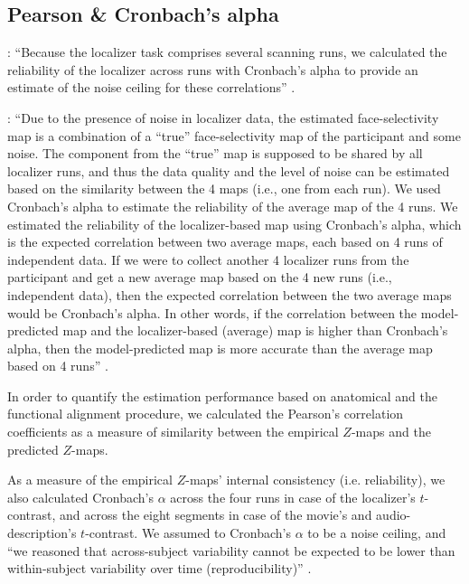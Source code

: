 \subsection{Pearson \& Cronbach's alpha}




\citet{jiahui2022cross}: ``Because the localizer task comprises several scanning
runs, we calculated the reliability of the localizer across runs with Cronbach's
alpha to provide an estimate of the noise ceiling for these correlations''
\citep{jiahui2022cross}.

%
\citep{feilong2022individualized}: ``Due to the presence of noise in localizer
data, the estimated face-selectivity map is a combination of a “true”
face-selectivity map of the participant and some noise.
%
The component from the “true” map is supposed to be shared by all localizer
runs, and thus the data quality and the level of noise can be estimated based on
the similarity between the 4 maps (i.e., one from each run).
%
We used Cronbach's alpha to estimate the reliability  of the average map of the
4 runs.
%
We estimated the reliability of the localizer-based map using Cronbach's alpha,
which is the expected correlation between two average maps, each based on 4 runs
of independent data.
%
If we were to collect another 4 localizer runs from the participant and get a
new average map based on the 4 new runs (i.e., independent data), then the
expected correlation between the two average maps would be Cronbach's alpha.
%
In other words, if the correlation between the model-predicted map and the
localizer-based (average) map is higher than Cronbach's alpha, then the
model-predicted map is more accurate than the average map based on 4 runs''
\citep{feilong2022individualized}.

In order to quantify the estimation performance based on anatomical and the
functional alignment procedure, we calculated the Pearson's correlation
coefficients as a measure of similarity between the empirical $Z$-maps and the
predicted $Z$-maps.

As a measure of the empirical $Z$-maps' internal consistency (i.e.
reliability), we also calculated Cronbach's $\alpha$ across the four runs in
case of the localizer's $t$-contrast, and across the eight segments in case of
the movie's and audio-description's $t$-contrast.
%
We assumed to Cronbach's $\alpha$ to be a noise ceiling, and ``we reasoned that
across-subject variability cannot be expected to be lower than within-subject
variability over time (reproducibility)'' \citep{rosenke2021probabilistic}.

